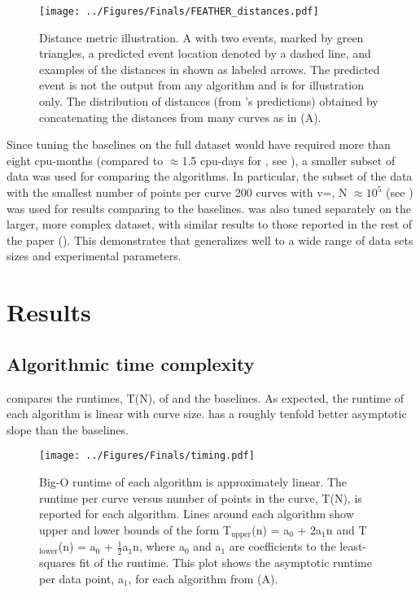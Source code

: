 \begin{figure}[htpb]
\caption[Distance metric illustration]{\noindent{} Distance metric illustration.  A \fec{} with two events, marked by green triangles, a predicted event location denoted by a dashed line, and examples of the distances in  shown as labeled arrows. The predicted event is not the output from any algorithm and is for illustration only.  The distribution of distances (from \name{}'s predictions) obtained by concatenating the distances from many curves as in (A). }
\centering
\texttt{[image: ../Figures/Finals/FEATHER\_distances.pdf]}%
\end{figure}


Since tuning the baselines on the full dataset would have required more than eight cpu-months (compared to $\approx$1.5 cpu-days for \name{}, see ), a smaller subset of data was used for comparing the algorithms. In particular, the subset of the data with the smallest number of points per curve \textemdash{} 200 curves with v=, N $\approx{}10^{5}$ (see ) \textemdash{} was used for results comparing \name{} to the baselines. \name{} was also tuned separately on the larger, more complex dataset, with similar results to those reported in the rest of the paper (). This demonstrates that \name{} generalizes well to a wide range of data sets sizes and experimental parameters.

\chapter{Results}

\section{Algorithmic time complexity}

 compares the runtimes, T(N), of \name{} and the baselines. As expected, the runtime of each algorithm is linear with curve size. \name{} has a roughly tenfold better asymptotic slope than the baselines.  

\begin{figure}[htpb]
\caption[Runtime versus length of curve]{\noindent{} Big-O runtime of each algorithm is approximately linear.  The runtime per curve versus number of points in the curve, T(N), is reported for each algorithm. Lines around each algorithm show upper and lower bounds of the form T$_{\mathrm{upper}}$(n) = a$_0$ + 2a$_1$n  and T$_{\mathrm{lower}}$(n) = a$_0$ + $\frac{1}{2}$a$_1$n, where a$_0$ and a$_1$ are coefficients to the least-squares fit of the runtime.  This plot shows the asymptotic runtime per data point, a$_1$, for each algorithm from (A). }
\centering
\texttt{[image: ../Figures/Finals/timing.pdf]}%
\end{figure}

